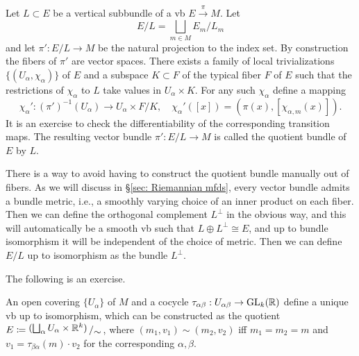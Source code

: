 \begin{defn}
    Let $L\subset E$ be a vertical subbundle of a \gls{vb} $E\overset{\pi}{\to}M$. Let
    \[E\slash L=\bigsqcup_{m\in M}E_m\slash L_m\]
    and let $\pi':E\slash L\to M$ be the natural projection to the index set. By construction the fibers of $\pi'$ are vector spaces. There exists a family of local trivializations $\{(U_\alpha,\chi_\alpha)\}$ of $E$ and a subspace $K\subset F$ of the typical fiber $F$ of $E$ such that the restrictions of $\chi_\alpha$ to $L$ take values in $U_\alpha\times K$. For any such $\chi_\alpha$ define a mapping
    \[\chi_\alpha':(\pi')^{-1}(U_\alpha)\to U_\alpha\times F\slash K,\quad \chi_\alpha'([x])=(\pi(x),[\chi_{\alpha,m}(x)]).\]
    It is an exercise to check the differentiability of the corresponding transition maps. The resulting vector bundle $\pi':E\slash L\to M$ is called the quotient bundle of $E$ by $L$.
\end{defn}
\begin{rem}
    There is a way to avoid having to construct the quotient bundle manually out of fibers. As we will discuss in \S\ref{sec: Riemannian mfds}, every vector bundle admits a bundle metric, i.e., a smoothly varying choice of an inner product on each fiber. Then we can define the orthogonal complement $L^\perp$ in the obvious way, and this will automatically be a smooth \gls{vb} such that $L\oplus L^\perp\cong E$, and up to bundle isomorphism it will be independent of the choice of metric. Then we can define $E\slash L$ up to isomorphism as the bundle $L^\perp$.
\end{rem}


The following is an exercise.
\begin{prop}
    An open covering $\{U_\alpha\}$ of $M$ and a cocycle $\tau_{\alpha\beta}:U_{\alpha\beta}\to\operatorname{GL}_k (\mathbb{R} )$ define a unique \gls{vb} up to isomorphism, which can be constructed as the quotient $E\coloneqq \bigslant{(\bigsqcup_\alpha U_\alpha \times \bbR^k)}{\sim}$, where $(m_1,v_1)\sim(m_2,v_2)$ iff $m_1=m_2=m$ and $v_1=\tau_{\beta\alpha}(m)\cdot v_2$ for the corresponding $\alpha,\beta$.
\end{prop}




